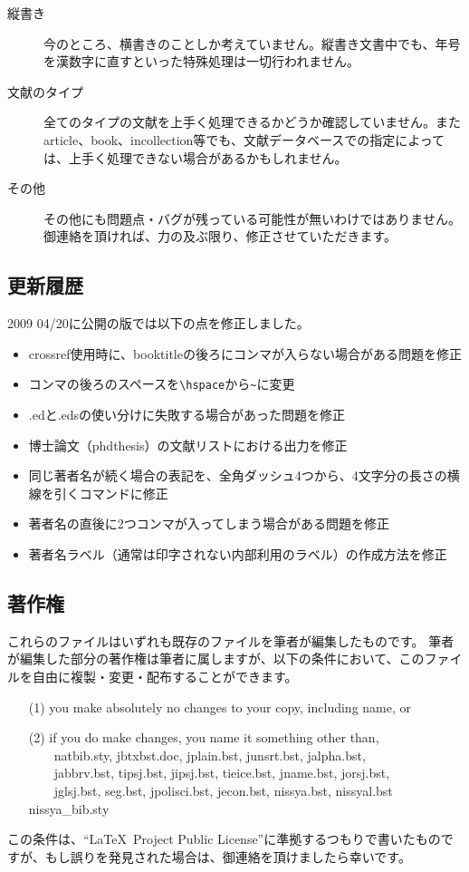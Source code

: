 \documentclass[article, 11pt]{jlreq}
\begin{document}
\begin{description}
\item[縦書き]  今のところ、横書きのことしか考えていません。縦書き文書中でも、年号を漢数字に直すといった特殊処理は一切行われません。
\item[文献のタイプ] 全てのタイプの文献を上手く処理できるかどうか確認していません。またarticle、book、incollection等でも、文献データベースでの指定によっては、上手く処理できない場合があるかもしれません。
\item[その他] その他にも問題点・バグが残っている可能性が無いわけではありません。御連絡を頂ければ、力の及ぶ限り、修正させていただきます。
\end{description}


\subsection{更新履歴}

2009 04/20に公開の版では以下の点を修正しました。
\begin{itemize}
\item crossref使用時に、booktitleの後ろにコンマが入らない場合がある問題を修正
\item コンマの後ろのスペースを\verb|\hspace|から\verb|~|に変更
\item .edと.edsの使い分けに失敗する場合があった問題を修正
\item 博士論文（phdthesis）の文献リストにおける出力を修正
\item 同じ著者名が続く場合の表記を、全角ダッシュ4つから、4文字分の長さの横線を引くコマンドに修正
\item 著者名の直後に2つコンマが入ってしまう場合がある問題を修正
\item 著者名ラベル（通常は印字されない内部利用のラベル）の作成方法を修正
\end{itemize}


\subsection{著作権}

これらのファイルはいずれも既存のファイルを筆者が編集したものです。
筆者が編集した部分の著作権は筆者に属しますが、以下の条件において、このファイルを自由に複製・変更・配布することができます。
\begin{enumerate}
\item[(1)] you make absolutely no changes to your copy, including name, or
\item[(2)] if you do make changes, you name it something other than,\\
　　natbib.sty, jbtxbst.doc, jplain.bst, junsrt.bst, jalpha.bst,\\
　　jabbrv.bst, tipsj.bst, jipsj.bst, tieice.bst, jname.bst, jorsj.bst,\\
　　jglsj.bst, seg.bst, jpolisci.bst, jecon.bst, nissya.bst, nissyal.bst nissya\_bib.sty
\end{enumerate}
この条件は、``\LaTeX \ Project Public License''に準拠するつもりで書いたものですが、もし誤りを発見された場合は、御連絡を頂けましたら幸いです。
\end{document}
